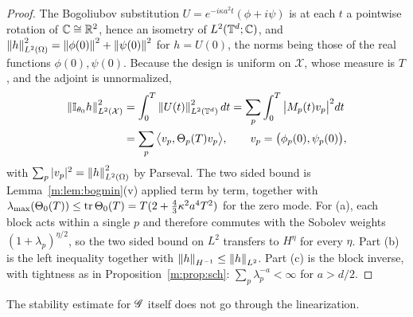 \begin{proof}
The Bogoliubov substitution $U=e^{-i\kappa a^2t}(\phi+i\psi)$ is at each $t$ a pointwise rotation of $\mathbb{C}\cong\mathbb{R}^2$, hence an isometry of $L^2(\mathbb{T}^d;\mathbb{C})$, and $\left\|h\right\|^2_{L^2(\Omega)}=\left\|\phi(0)\right\|^2+\left\|\psi(0)\right\|^2$ for $h=U(0)$, the norms being those of the real functions $\phi(0),\psi(0)$. Because the design is uniform on $\mathcal X$, whose measure is $T$, and the adjoint is unnormalized,
\[
\begin{aligned}
\left\|\mathbb{I}_{\theta_0}h\right\|^2_{L^2(\mathcal X)}&=\int_0^T\left\|U(t)\right\|^2_{L^2(\mathbb{T}^d)}dt=\sum_p\int_0^T\big|M_p(t)v_p\big|^2dt\\
&=\sum_p\big\langle v_p,\Theta_p(T)v_p\big\rangle,\qquad v_p=\big(\phi_p(0),\psi_p(0)\big),
\end{aligned}
\]
with $\sum_p|v_p|^2=\left\|h\right\|^2_{L^2(\Omega)}$ by Parseval. The two sided bound is Lemma~\ref{m:lem:bogmin}(v) applied term by term, together with $\lambda_{\max}(\Theta_0(T))\le\mathrm{tr}\,\Theta_0(T)=T(2+\frac43\kappa^2a^4T^2)$ for the zero mode. For (a), each block acts within a single $p$ and therefore commutes with the Sobolev weights $(1+\lambda_p)^{\eta/2}$, so the two sided bound on $L^2$ transfers to $H^\eta$ for every $\eta$. Part (b) is the left inequality together with $\left\|h\right\|_{H^{-1}}\le\left\|h\right\|_{L^2}$. Part (c) is the block inverse, with tightness as in Proposition~\ref{m:prop:sch}: $\sum_p\lambda_p^{-a}<\infty$ for $a>d/2$.
\end{proof}

The stability estimate for $\mathscr{G}$ itself does not go through the linearization.

